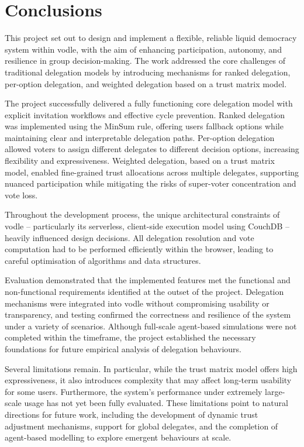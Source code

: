 \chapter{Conclusions}\label{ch:conclusions}
This project set out to design and implement a flexible, reliable liquid democracy system within vodle, with the aim of enhancing participation, autonomy, and resilience in group decision-making. The work addressed the core challenges of traditional delegation models by introducing mechanisms for ranked delegation, per-option delegation, and weighted delegation based on a trust matrix model.

The project successfully delivered a fully functioning core delegation model with explicit invitation workflows and effective cycle prevention. Ranked delegation was implemented using the MinSum rule, offering users fallback options while maintaining clear and interpretable delegation paths. Per-option delegation allowed voters to assign different delegates to different decision options, increasing flexibility and expressiveness. Weighted delegation, based on a trust matrix model, enabled fine-grained trust allocations across multiple delegates, supporting nuanced participation while mitigating the risks of super-voter concentration and vote loss.

Throughout the development process, the unique architectural constraints of vodle -- particularly its serverless, client-side execution model using CouchDB -- heavily influenced design decisions. All delegation resolution and vote computation had to be performed efficiently within the browser, leading to careful optimisation of algorithms and data structures.

Evaluation demonstrated that the implemented features met the functional and non-functional requirements identified at the outset of the project. Delegation mechanisms were integrated into vodle without compromising usability or transparency, and testing confirmed the correctness and resilience of the system under a variety of scenarios. Although full-scale agent-based simulations were not completed within the timeframe, the project established the necessary foundations for future empirical analysis of delegation behaviours.

Several limitations remain. In particular, while the trust matrix model offers high expressiveness, it also introduces complexity that may affect long-term usability for some users. Furthermore, the system's performance under extremely large-scale usage has not yet been fully evaluated. These limitations point to natural directions for future work, including the development of dynamic trust adjustment mechanisms, support for global delegates, and the completion of agent-based modelling to explore emergent behaviours at scale.

